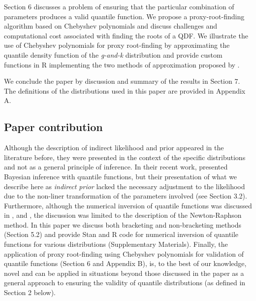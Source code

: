 \documentclass[
  12pt,
]{article}
\begin{document}
Section 6 discusses a problem of ensuring that the particular combination of parameters produces a valid quantile function. We propose a proxy-root-finding algorithm based on Chebyshev polynomials and discuss challenges and computational cost associated with finding the roots of a QDF. We illustrate the use of Chebyshev polynomials for proxy root-finding by approximating the quantile density function of the \emph{g-and-k} distribution and provide custom functions in R implementing the two methods of approximation proposed by \citet{boyd2013FindingZerosUnivariate}.

We conclude the paper by discussion and summary of the results in Section 7. The definitions of the distributions used in this paper are provided in Appendix A.

\hypertarget{paper-contribution}{%
\subsection{Paper contribution}\label{paper-contribution}}

Although the description of indirect likelihood \citep{rayner2002NumericalMaximumLikelihood, king1999NewDistributionalFitting} and prior \citep{nair2020BayesianInferenceQuantile} appeared in the literature before, they were presented in the context of the specific distributions and not as a general principle of inference. In their recent work, \citet{nair2020BayesianInferenceQuantile} presented Bayesian inference with quantile functions, but their presentation of what we describe here as \emph{indirect prior} lacked the necessary adjustment to the likelihood due to the non-liner transformation of the parameters involved (see Section 3.2). Furthermore, although the numerical inversion of quantile functions was discussed in \citet{gilchrist2000StatisticalModellingQuantile}, \citet{nair2009QuantileBasedReliabilityAnalysis} and \citet{nair2020BayesianInferenceQuantile}, the discussion was limited to the description of the Newton-Raphson method. In this paper we discuss both bracketing and non-bracketing methods (Section 5.2) and provide Stan and R code for numerical inversion of quantile functions for various distributions (Supplementary Materials). Finally, the application of proxy root-finding using Chebyshev polynomials for validation of quantile functions (Section 6 and Appendix B), is, to the best of our knowledge, novel and can be applied in situations beyond those discussed in the paper as a general approach to ensuring the validity of quantile distributions (as defined in Section 2 below).
\end{document}
